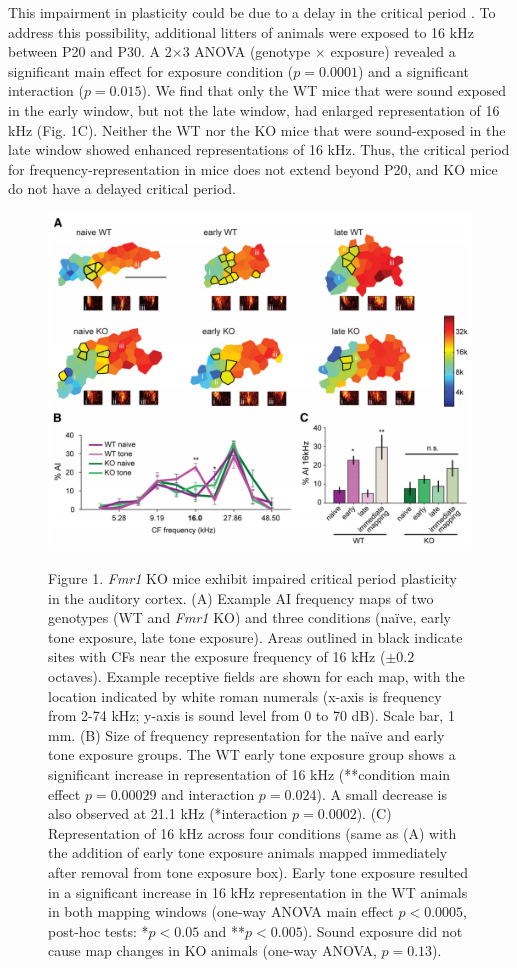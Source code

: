 This impairment in plasticity could be due to a delay in the critical period \cite{Harlow2010a}. To address this possibility, additional litters of animals were exposed to 16 kHz between P20 and P30. A 2$\times$3 ANOVA (genotype $\times$ exposure) revealed a significant main effect for exposure condition ($p=0.0001$) and a significant interaction ($p=0.015$). We find that only the WT mice that were sound exposed in the early window, but not the late window, had enlarged representation of 16 kHz (Fig. 1C). Neither the WT nor the KO mice that were sound-exposed in the late window showed enhanced representations of 16 kHz. Thus, the critical period for frequency-representation in mice does not extend beyond P20, and KO mice do not have a delayed critical period.

\begin{figure}[p]
	\centering
		\includegraphics[width=6in]{images/C2F1}
	\begin{changemargin}{1in}{1in}
	\footnotesize{Figure 1. \textit{Fmr1} KO mice exhibit impaired critical period plasticity in the auditory cortex. (A) Example AI frequency maps of two genotypes (WT and \textit{Fmr1} KO) and three conditions (na\"ive, early tone exposure, late tone exposure). Areas outlined in black indicate sites with CFs near the exposure frequency of 16 kHz ($\pm0.2$ octaves). Example receptive fields are shown for each map, with the location indicated by white roman numerals (x-axis is frequency from 2-74 kHz; y-axis is sound level from 0 to 70 dB). Scale bar, 1 mm. (B) Size of frequency representation for the na\"ive and early tone exposure groups. The WT early tone exposure group shows a significant increase in representation of 16 kHz (**condition main effect $p=0.00029$ and interaction $p=0.024$). A small decrease is also observed at 21.1 kHz (*interaction $p=0.0002$). (C) Representation of 16 kHz across four conditions (same as (A) with the addition of early tone exposure animals mapped immediately after removal from tone exposure box). Early tone exposure resulted in a significant increase in 16 kHz representation in the WT animals in both mapping windows (one-way ANOVA main effect $p<0.0005$, post-hoc tests: *$p<0.05$ and **$p<0.005$). Sound exposure did not cause map changes in KO animals (one-way ANOVA, $p=0.13$).}

\end{changemargin}
\end{figure}
